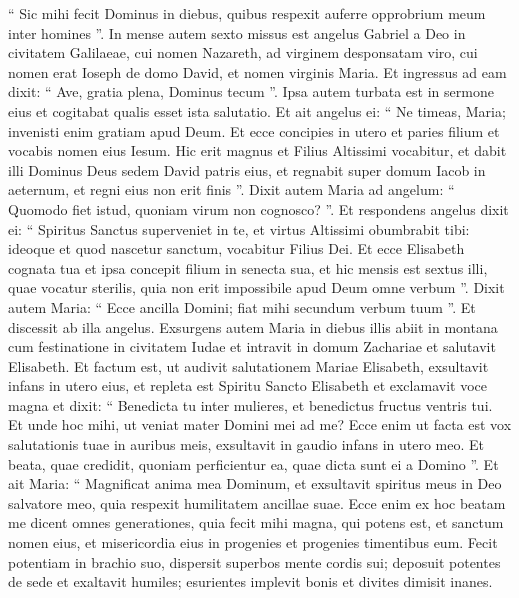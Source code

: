 \begin{biblechapter}
\verse “ Sic mihi fecit Dominus in diebus, quibus respexit auferre opprobrium meum inter homines ”.
 \verse In mense autem sexto missus est angelus Gabriel a Deo in civitatem Galilaeae, cui nomen Nazareth, 
\verse ad virginem desponsatam viro, cui nomen erat Ioseph de domo David, et nomen virginis Maria. 
\verse Et ingressus ad eam dixit: “ Ave, gratia plena, Dominus tecum ”. 
\verse Ipsa autem turbata est in sermone eius et cogitabat qualis esset ista salutatio. 
\verse Et ait angelus ei: “ Ne timeas, Maria; invenisti enim gratiam apud Deum. 
\verse Et ecce concipies in utero et paries filium et vocabis nomen eius Iesum. 
\verse Hic erit magnus et Filius Altissimi vocabitur, et dabit illi Dominus Deus sedem David patris eius, 
\verse et regnabit super domum Iacob in aeternum, et regni eius non erit finis ”.
 \verse Dixit autem Maria ad angelum: “ Quomodo fiet istud, quoniam virum non cognosco? ”. 
\verse Et respondens angelus dixit ei: “ Spiritus Sanctus superveniet in te, et virtus Altissimi obumbrabit tibi: ideoque et quod nascetur sanctum, vocabitur Filius Dei. 
\verse Et ecce Elisabeth cognata tua et ipsa concepit filium in senecta sua, et hic mensis est sextus illi, quae vocatur sterilis, 
\verse quia non erit impossibile apud Deum omne verbum ”. 
\verse Dixit autem Maria: “ Ecce ancilla Domini; fiat mihi secundum verbum tuum ”. Et discessit ab illa angelus.
 \verse Exsurgens autem Maria in diebus illis abiit in montana cum festinatione in civitatem Iudae 
\verse et intravit in domum Zachariae et salutavit Elisabeth. 
 \verse Et factum est, ut audivit salutationem Mariae Elisabeth, exsultavit infans in utero eius, et repleta est Spiritu Sancto Elisabeth 
\verse et exclamavit voce magna et dixit: “ Benedicta tu inter mulieres, et benedictus fructus ventris tui. 
\verse Et unde hoc mihi, ut veniat mater Domini mei ad me? 
\verse Ecce enim ut facta est vox salutationis tuae in auribus meis, exsultavit in gaudio infans in utero meo. 
\verse Et beata, quae credidit, quoniam perficientur ea, quae dicta sunt ei a Domino ”.
 \verse Et ait Maria:
 “ Magnificat anima mea Dominum,
 \verse et exsultavit spiritus meus in Deo salvatore meo,
 \verse quia respexit humilitatem ancillae suae.
 Ecce enim ex hoc beatam me dicent omnes generationes,
 \verse quia fecit mihi magna, qui potens est,
 et sanctum nomen eius,
 \verse et misericordia eius in progenies et progenies
 timentibus eum.
 \verse Fecit potentiam in brachio suo,
 dispersit superbos mente cordis sui;
 \verse deposuit potentes de sede
 et exaltavit humiles;
 \verse esurientes implevit bonis
 et divites dimisit inanes.

\end{biblechapter}
